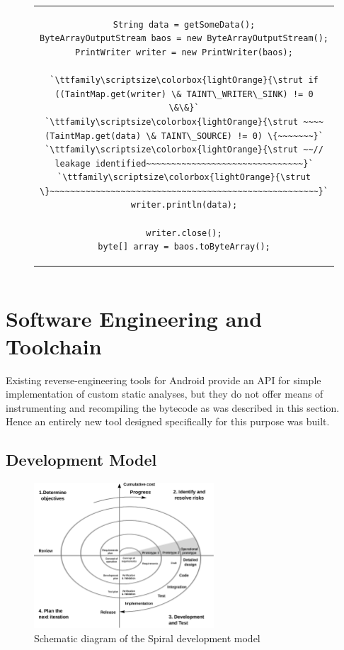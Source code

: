 \documentclass[12pt,twoside,notitlepage]{report}
\newcommand{\highlight}[1]{\colorbox{lightOrange}{\strut #1}}
\newcommand{\lsthl}[1] {\ttfamily\scriptsize\highlight{#1}}
\begin{document}
\begin{figure}[h]
	\centering
	\begin{tabular}{c}
	\begin{lstlisting}
String data = getSomeData();
ByteArrayOutputStream baos = new ByteArrayOutputStream();
PrintWriter writer = new PrintWriter(baos);

`\lsthl{if ((TaintMap.get(writer) \& TAINT\_WRITER\_SINK) != 0 \&\&}`
`\lsthl{~~~~(TaintMap.get(data) \& TAINT\_SOURCE) != 0) \{~~~~~~~}`
`\lsthl{~~// leakage identified~~~~~~~~~~~~~~~~~~~~~~~~~~~~~~~}`
`\lsthl{\}~~~~~~~~~~~~~~~~~~~~~~~~~~~~~~~~~~~~~~~~~~~~~~~~~~~~~}`
writer.println(data);

writer.close();
byte[] array = baos.toByteArray();
	\end{lstlisting}
	\end{tabular}
	\begin{lstlisting}[caption={Writer interface used to turn data into a byte array, with sink instrumentation.},
	                   label={listing:Sink_ByteArray}]
	\end{lstlisting}
\end{figure}

\section{Software Engineering and Toolchain}

Existing reverse-engineering tools for Android provide an API for simple implementation of custom static analyses, but they do not offer means of instrumenting and recompiling the bytecode as was described in this section. Hence an entirely new tool designed specifically for this purpose was built.

\subsection{Development Model}

\begin{figure}
	\centerline{	
		\includegraphics[width=0.6\textwidth]{figs/fig_prep_spiral.eps}
	}
	\caption{Schematic diagram of the Spiral development model}
	\label{fig:Preparation_Spiral}
\end{figure}
\end{document}
